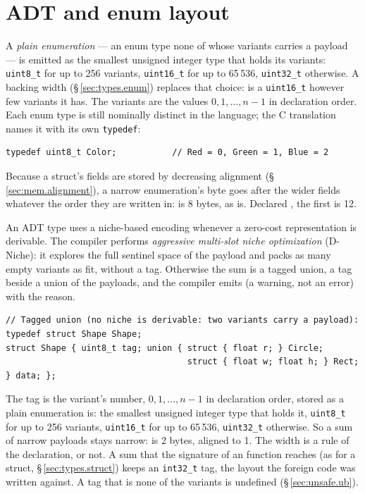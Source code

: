\section{ADT and enum layout}
\label{sec:mem.adt-layout}

\pnum
A \textit{plain enumeration} --- an enum type none of whose variants carries a payload ---
is emitted as the smallest unsigned integer type that holds its variants: \texttt{uint8\_t}
for up to 256 variants, \texttt{uint16\_t} for up to 65\,536, \texttt{uint32\_t} otherwise.
A backing width (\S\,\ref{sec:types.enum}) replaces that choice: 
is a \texttt{uint16\_t} however few variants it has.
The variants are the values \(0, 1, \ldots, n-1\) in declaration order. Each enum type is
still nominally distinct in the language; the C translation names it with its own
\texttt{typedef}:

\begin{verbatim}
typedef uint8_t Color;           // Red = 0, Green = 1, Blue = 2
\end{verbatim}

\pnum
Because a struct's fields are stored by decreasing alignment (\S\,\ref{sec:mem.alignment}), a
narrow enumeration's byte goes after the wider fields whatever the order they are written in:
 is 8 bytes, as  is.
Declared \tok{[ordered]}, the first is 12.

\pnum
An ADT type uses a niche-based encoding whenever a zero-cost
representation is derivable. The compiler performs \textit{aggressive
multi-slot niche optimization} (D-Niche): it explores the full
sentinel space of the payload and packs as many empty variants as
fit, without a tag. Otherwise the sum is a tagged union, a tag beside a
union of the payloads, and the compiler emits  (a warning,
not an error) with the reason.

\begin{verbatim}
// Tagged union (no niche is derivable: two variants carry a payload):
typedef struct Shape Shape;
struct Shape { uint8_t tag; union { struct { float r; } Circle;
                                    struct { float w; float h; } Rect; } data; };
\end{verbatim}

\pnum
The tag is the variant's number, \(0, 1, \ldots, n-1\) in declaration order, stored as a
plain enumeration is: the smallest unsigned integer type that holds it, \texttt{uint8\_t} for
up to 256 variants, \texttt{uint16\_t} for up to 65\,536, \texttt{uint32\_t} otherwise. So a
sum of narrow payloads stays narrow:  is 2 bytes,
aligned to 1. The width is a rule of the declaration, \tok{[ordered]} or not. A sum that the
signature of an  function reaches (as for a struct, \S\,\ref{sec:types.struct})
keeps an \texttt{int32\_t} tag, the layout the foreign code was written against. A tag that is
none of the variants is undefined (\S\,\ref{sec:unsafe.ub}).

